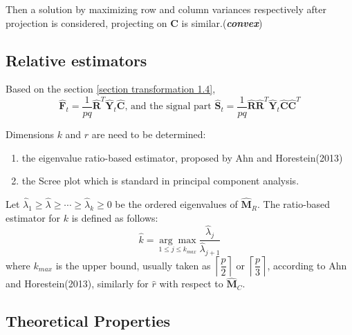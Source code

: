\documentclass{article}[12pt]
\def\lc{\left\lceil}
\def\rc{\right\rceil}
\begin{document}
\noindent Then a solution by maximizing row and column variances respectively after projection is considered, projecting on $\mathbf{C}$ is similar.(\textbf{\textit{convex}})


\subsection{Relative estimators}
Based on the section \ref{section transformation 1.4}, 
$$\mathbf{\widehat{F}}_t = \dfrac{1}{pq}\mathbf{\widehat{R}}^T\mathbf{\widehat{Y}}_t\mathbf{\widehat{C}}\text{, and the signal part }\mathbf{\widehat{S}}_t = \dfrac{1}{pq}\mathbf{\widehat{R}}\mathbf{\widehat{R}}^T\mathbf{\widehat{Y}}_t\mathbf{\widehat{C}}\mathbf{\widehat{C}}^T$$
 
\noindent Dimensions $k$ and $r$ are need to be determined:
\begin{enumerate}
    \item the eigenvalue ratio-based estimator, proposed by Ahn and Horestein(2013) 
    \item the Scree plot which is standard in principal component analysis. 
\end{enumerate}
\noindent Let $\hat{\lambda}_1 \geq \hat{\lambda} \geq \cdots \geq \hat{\lambda}_k \geq 0$ be the ordered eigenvalues of $\mathbf{\widehat{M}}_R$. The ratio-based estimator for $k$ is defined as follows:
    $$\widehat{k} = \underset{1 \leq j \leq k_{max}}{\arg\max }\dfrac{\widehat{\lambda}_j}{\widehat{\lambda}_{j+1}}$$
    where $k_{max}$ is the upper bound, usually taken as $\lc\dfrac{p}{2}\rc$ or $\lc\dfrac{p}{3}\rc$, according to Ahn and Horestein(2013),  similarly for $\widehat{r}$ with respect to $\mathbf{\widehat{M}}_C$.  

\subsection{Theoretical Properties}
\end{document}
